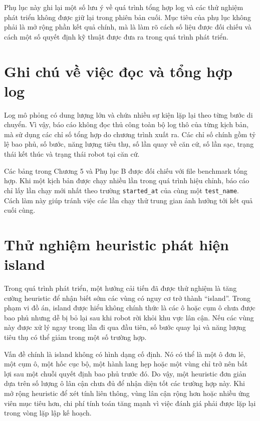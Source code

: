 \documentclass[../DoAn.tex]{subfiles}
\begin{document}
Phụ lục này ghi lại một số lưu ý về quá trình tổng hợp log và các thử nghiệm phát triển không được giữ lại trong phiên bản cuối. Mục tiêu của phụ lục không phải là mở rộng phần kết quả chính, mà là làm rõ cách số liệu được đối chiếu và cách một số quyết định kỹ thuật được đưa ra trong quá trình phát triển.

\section{Ghi chú về việc đọc và tổng hợp log}

Log mô phỏng có dung lượng lớn và chứa nhiều sự kiện lặp lại theo từng bước di chuyển. Vì vậy, báo cáo không đọc thủ công toàn bộ log thô của từng kịch bản, mà sử dụng các chỉ số tổng hợp do chương trình xuất ra. Các chỉ số chính gồm tỷ lệ bao phủ, số bước, năng lượng tiêu thụ, số lần quay về căn cứ, số lần sạc, trạng thái kết thúc và trạng thái robot tại căn cứ.

Các bảng trong Chương 5 và Phụ lục B được đối chiếu với file benchmark tổng hợp. Khi một kịch bản được chạy nhiều lần trong quá trình hiệu chỉnh, báo cáo chỉ lấy lần chạy mới nhất theo trường \texttt{started\_at} của cùng một \texttt{test\_name}. Cách làm này giúp tránh việc các lần chạy thử trung gian ảnh hưởng tới kết quả cuối cùng.

\section{Thử nghiệm heuristic phát hiện island}

Trong quá trình phát triển, một hướng cải tiến đã được thử nghiệm là tăng cường heuristic để nhận biết sớm các vùng có nguy cơ trở thành ``island''. Trong phạm vi đồ án, island được hiểu không chính thức là các ô hoặc cụm ô chưa được bao phủ nhưng dễ bị bỏ lại sau khi robot rời khỏi khu vực lân cận. Nếu các vùng này được xử lý ngay trong lần đi qua đầu tiên, số bước quay lại và năng lượng tiêu thụ có thể giảm trong một số trường hợp.

Vấn đề chính là island không có hình dạng cố định. Nó có thể là một ô đơn lẻ, một cụm ô, một hốc cục bộ, một hành lang hẹp hoặc một vùng chỉ trở nên bất lợi sau một chuỗi quyết định bao phủ trước đó. Do vậy, một heuristic đơn giản dựa trên số lượng ô lân cận chưa đủ để nhận diện tốt các trường hợp này. Khi mở rộng heuristic để xét tính liên thông, vùng lân cận rộng hơn hoặc nhiều ứng viên mục tiêu hơn, chi phí tính toán tăng mạnh vì việc đánh giá phải được lặp lại trong vòng lặp lập kế hoạch.
\end{document}
